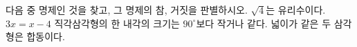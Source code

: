 다음 중 명제인 것을 찾고, 그 명제의 참, 거짓을 판별하시오.
 $\sqrt{4}$는 유리수이다.
 $3x=x-4$
 직각삼각형의 한 내각의 크기는 $90^\circ$보다 작거나 같다.
 넓이가 같은 두 삼각형은 합동이다.
